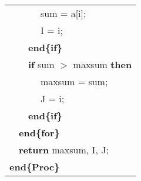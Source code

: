 \begin{solution}
\begin{enumerate}
\begin{table}[!htb]
\begin{tabular}{llll}
 &  &  & sum = a[i]; \\
 &  &  & I = i; \\
 &  & \multicolumn{2}{l}{\textbf{end\{if\}}} \\
 &  & \multicolumn{2}{l}{\textbf{if} sum $>$ maxsum \textbf{then}} \\
 &  &  & maxsum = sum; \\
 &  &  & J = i; \\
 &  & \multicolumn{2}{l}{\textbf{end\{if\}}} \\
 & \multicolumn{3}{l}{\textbf{end\{for\}}} \\
 & \multicolumn{3}{l}{\textbf{return} maxsum, I, J;} \\
\multicolumn{4}{l}{\textbf{end\{Proc\}}} \\
\hline
\end{tabular}
\end{table}
\end{enumerate}

\end{solution}
